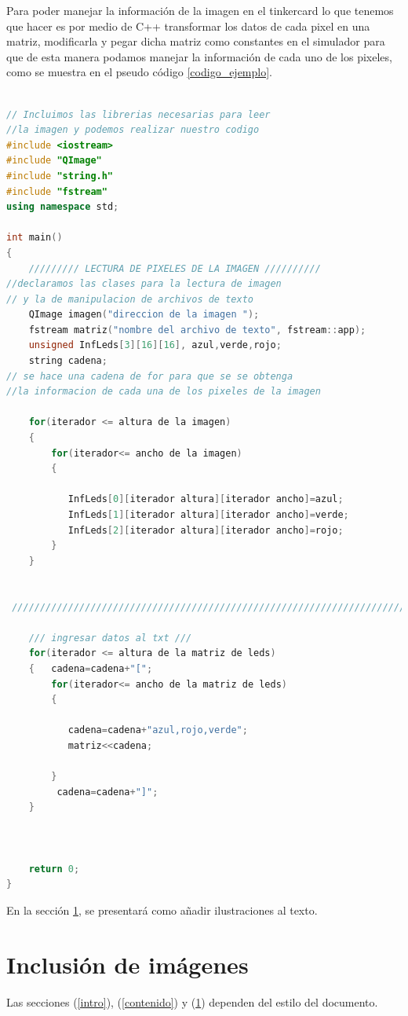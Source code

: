 \documentclass{article}
\begin{document}
Para poder manejar la información de la imagen en el tinkercard lo que tenemos que hacer es por medio de C++ transformar los datos de cada pixel en una matriz, modificarla y pegar dicha matriz como constantes en el simulador para que de esta manera podamos manejar la información de cada uno de los pixeles, como se muestra en el pseudo código \ref{codigo_ejemplo}. 
\begin{lstlisting}[language=C++, label=codigo_ejemplo]

// Incluimos las librerias necesarias para leer
//la imagen y podemos realizar nuestro codigo
#include <iostream>
#include "QImage"
#include "string.h"
#include "fstream"
using namespace std;

int main()
{
    ///////// LECTURA DE PIXELES DE LA IMAGEN //////////
//declaramos las clases para la lectura de imagen
// y la de manipulacion de archivos de texto
    QImage imagen("direccion de la imagen ");
    fstream matriz("nombre del archivo de texto", fstream::app);
    unsigned InfLeds[3][16][16], azul,verde,rojo;
    string cadena;
// se hace una cadena de for para que se se obtenga
//la informacion de cada una de los pixeles de la imagen

    for(iterador <= altura de la imagen)
    {
        for(iterador<= ancho de la imagen)
        {

           InfLeds[0][iterador altura][iterador ancho]=azul;
           InfLeds[1][iterador altura][iterador ancho]=verde;
           InfLeds[2][iterador altura][iterador ancho]=rojo;
        }
    }


 /////////////////////////////////////////////////////////////////////////////////////////

    /// ingresar datos al txt ///
    for(iterador <= altura de la matriz de leds)
    {   cadena=cadena+"[";
        for(iterador<= ancho de la matriz de leds)
        {

           cadena=cadena+"azul,rojo,verde";
           matriz<<cadena;

        }
         cadena=cadena+"]";
    }



    return 0;
}
\end{lstlisting}
En la sección \ref{imagenes}, se presentará como añadir ilustraciones al texto.

\section{Inclusión de imágenes} \label{imagenes}




Las secciones (\ref{intro}), (\ref{contenido}) y (\ref{imagenes}) dependen del estilo del documento.



\end{document}
